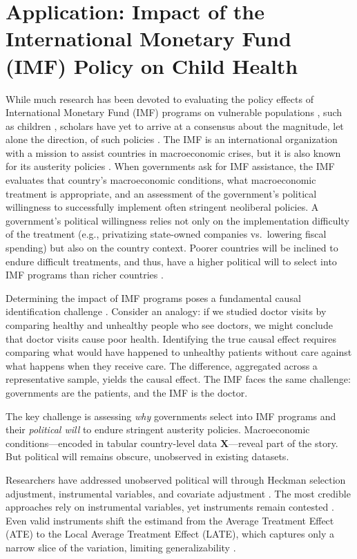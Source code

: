 \documentclass[11pt]{article}
\newcommand{\bX}{\bm{X}} %
\begin{document}
\section{Application: Impact of the International Monetary Fund (IMF) Policy on Child Health}
\label{ss:imfexperiments}
While much research has been devoted to evaluating the policy effects of International Monetary Fund (IMF) programs on vulnerable populations \citep{stuckler2008}, such as children \citep{daoudImpactInternationalMonetary2017}, scholars have yet to arrive at a consensus about the magnitude, let alone the direction, of such policies \citep{stubbs2020}. The IMF is an international organization with a mission to assist countries in macroeconomic crises, but it is also known for its austerity policies \citep{babb2005}. When governments ask for IMF assistance, the IMF evaluates that country's macroeconomic conditions, what macroeconomic treatment is appropriate, and an assessment of the government's political willingness to successfully implement often stringent neoliberal policies. A government's political willingness relies not only on the implementation difficulty of the treatment (e.g., privatizing state-owned companies vs.\ lowering fiscal spending) but also on the country context. Poorer countries will be inclined to endure difficult treatments, and thus, have a higher political will to select into IMF programs than richer countries \citep{vreeland2003}.

Determining the impact of IMF programs poses a fundamental causal identification challenge \citep{dreher2009,imbens2015}. Consider an analogy: if we studied doctor visits by comparing healthy and unhealthy people who see doctors, we might conclude that doctor visits cause poor health. Identifying the true causal effect requires comparing what would have happened to unhealthy patients without care against what happens when they receive care. The difference, aggregated across a representative sample, yields the causal effect. The IMF faces the same challenge: governments are the patients, and the IMF is the doctor.

The key challenge is assessing \textit{why} governments select into IMF programs and their \textit{political will} to endure stringent austerity policies. Macroeconomic conditions---encoded in tabular country-level data $\bX$---reveal part of the story. But political will remains obscure, unobserved in existing datasets.

Researchers have addressed unobserved political will through Heckman selection adjustment, instrumental variables, and covariate adjustment \citep{stubbs2020}. The most credible approaches rely on instrumental variables, yet instruments remain contested \citep{imbens2015,deaton2010}. Even valid instruments shift the estimand from the Average Treatment Effect (ATE) to the Local Average Treatment Effect (LATE), which captures only a narrow slice of the variation, limiting generalizability \citep{imbens1994}.
\end{document}
